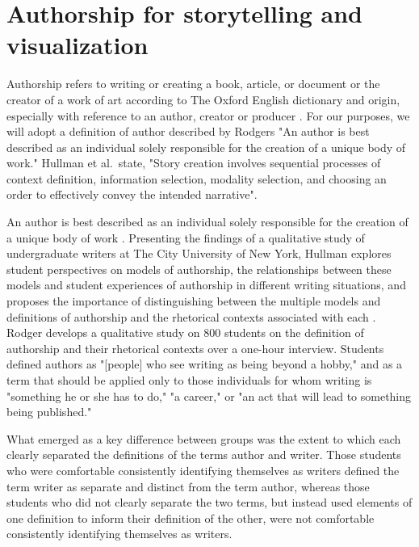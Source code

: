 \documentclass{egpubl}
\begin{document}
\section{Authorship for storytelling and visualization}
Authorship refers to writing or creating a book, article, or document or the creator of a work of art according to The Oxford English dictionary\cite{authoship2} and origin, especially with reference to an author, creator or producer \cite{authoship1}. For our purposes, we will adopt a definition of author described by Rodgers\cite{rodgers2011} "An author is best described as an individual solely responsible for the creation of a unique body of work."  Hullman \cite{hullman2013deeper} et al.\ state, "Story creation involves sequential processes of context definition, information selection, modality selection, and choosing an order to effectively convey the intended narrative".

An author is best described as an individual solely responsible for the creation of a unique body of work \cite{rodgers2011}.
 Presenting the findings of a qualitative study of undergraduate writers at The City University of New York, Hullman explores student perspectives on models of authorship, the relationships between these models and student experiences of authorship in different writing situations, and proposes the importance of distinguishing between the multiple models and definitions of authorship and the rhetorical contexts associated with each \cite{rodgers2011}.
Rodger develops a qualitative study on 800 students on the definition of authorship and their rhetorical contexts over a one-hour interview.
Students defined authors as "[people] who see writing as being beyond a hobby," and as a term that should be applied only to those
individuals for whom writing is "something he or she has to do," "a career," or "an act that will lead to something being published." 

What emerged as a key difference between groups was the extent to which each clearly separated the definitions of the terms author and writer. Those students who were comfortable consistently identifying themselves as writers defined the term writer as separate and distinct from the term author, whereas those students who did not clearly separate the two terms, but instead used elements of one definition to inform their definition of the other, were not comfortable consistently identifying themselves as writers.
\end{document}
